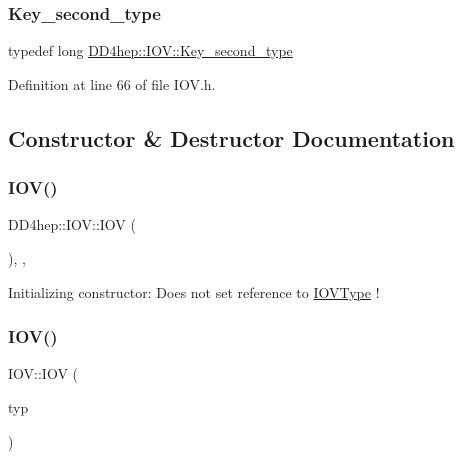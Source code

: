 \subsubsection{\texorpdfstring{Key\+\_\+second\+\_\+type}{Key\_second\_type}}
{\footnotesize\ttfamily typedef long \hyperlink{class_d_d4hep_1_1_i_o_v_ae1e4d1584dcc17a416008a93d94376b5}{D\+D4hep\+::\+I\+O\+V\+::\+Key\+\_\+second\+\_\+type}}



Definition at line 66 of file I\+O\+V.\+h.



\subsection{Constructor \& Destructor Documentation}
\hypertarget{class_d_d4hep_1_1_i_o_v_a7fd68c48e4ff18f072be1ca44f9a27dd}{}\label{class_d_d4hep_1_1_i_o_v_a7fd68c48e4ff18f072be1ca44f9a27dd} 
\subsubsection{\texorpdfstring{I\+O\+V()}{IOV()}\hspace{0.1cm}{\footnotesize\ttfamily [1/4]}}
{\footnotesize\ttfamily D\+D4hep\+::\+I\+O\+V\+::\+I\+OV (\begin{DoxyParamCaption}{ }\end{DoxyParamCaption})\hspace{0.3cm}{\ttfamily [explicit]}, {\ttfamily [private]}, {\ttfamily [delete]}}



Initializing constructor\+: Does not set reference to \hyperlink{class_d_d4hep_1_1_i_o_v_type}{I\+O\+V\+Type} ! 

\hypertarget{class_d_d4hep_1_1_i_o_v_a0a32eb684174feeec7047c7fe4d351cb}{}\label{class_d_d4hep_1_1_i_o_v_a0a32eb684174feeec7047c7fe4d351cb} 
\subsubsection{\texorpdfstring{I\+O\+V()}{IOV()}\hspace{0.1cm}{\footnotesize\ttfamily [2/4]}}
{\footnotesize\ttfamily I\+O\+V\+::\+I\+OV (\begin{DoxyParamCaption}\item[{const \hyperlink{class_d_d4hep_1_1_i_o_v_type}{I\+O\+V\+Type} $\ast$}]{typ }\end{DoxyParamCaption})\hspace{0.3cm}{\ttfamily [explicit]}}



